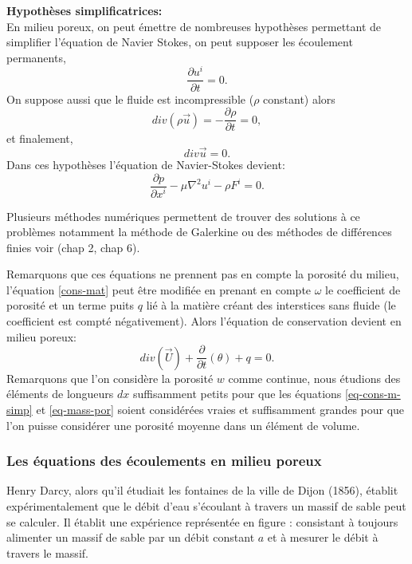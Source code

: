 \documentclass[a4paper,11pt]{article}
\numberwithin{equation}{section}
\begin{document}
\vspace{0.7cm}

\noindent \textbf{Hypothèses simplificatrices:}\\
En milieu poreux, on peut émettre de nombreuses hypothèses permettant de simplifier l'équation de Navier Stokes, on peut supposer les écoulement permanents,
\[\frac{\partial u^i}{\partial t}=0.\]
On suppose aussi que le fluide est incompressible ($\rho$ constant) alors
\[div(\rho \overrightarrow{u})=-\frac{\partial \rho}{\partial t}=0,\]
et finalement,
\[div \overrightarrow{u}=0.\]
Dans ces hypothèses l'équation de Navier-Stokes devient:
\begin{equation}
	\label{eq-cons-m-simp}
	\frac{\partial p}{\partial x^i}-\mu \nabla^2u^i-\rho F^i=0. 
\end{equation}

Plusieurs méthodes numériques permettent de trouver des solutions à ce problèmes notamment la méthode de Galerkine ou des méthodes de différences finies voir \cite{allaire2005analyse} (chap 2, chap 6). 

\vspace{7mm}

Remarquons que ces équations ne prennent pas en compte la porosité du milieu, l'équation \eqref{cons-mat} peut être modifiée en prenant en compte $\omega$ le coefficient de porosité et un terme puits $q$ lié à la matière créant des interstices sans fluide (le coefficient est compté négativement). Alors l'équation de conservation devient en milieu poreux:
\begin{equation}
	\label{eq-mass-por}
	div(\overrightarrow{U})+\frac{\partial}{\partial t}(\theta)+ q=0.
\end{equation}
Remarquons que l'on considère la porosité $w$ comme continue, nous étudions des éléments de longueurs $dx$ suffisamment petits pour que les équations \eqref{eq-cons-m-simp} et \eqref{eq-mass-por} soient considérées vraies et suffisamment grandes pour que l'on puisse considérer une porosité moyenne dans un élément de volume.

\subsubsection{Les équations des écoulements en milieu poreux}
\label{Darcy}
Henry Darcy, alors qu'il étudiait les fontaines de la ville de Dijon (1856), établit expérimentalement que le débit d'eau s'écoulant à travers un massif de sable peut se calculer. Il établit une expérience représentée en figure %
: consistant à toujours alimenter un massif de sable par un débit constant $a$ et à mesurer le débit à travers le massif.
\end{document}
